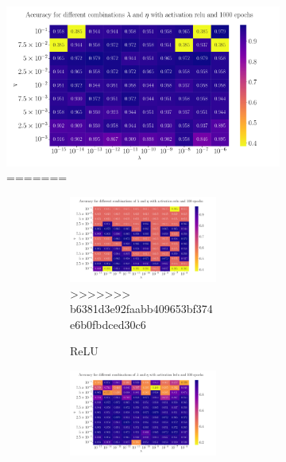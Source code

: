 \documentclass[%
reprint,
amsmath,amssymb,
aps,
]{revtex4-2}
\begin{document}
\begin{figure}
	\begin{subfigure}{0.497\textwidth}
		\includegraphics[width=\textwidth]{Python/Figures/accuracy_heatmap_relu_epochs1000.pdf}
=======
\begin{figure}[ht!]
	\begin{subfigure}{0.4353\textwidth}
		\includegraphics[width=\textwidth]{Python/Figures/Cancer_Accuracy_Heatmap_relu_Epochs100.pdf}
>>>>>>> b6381d3e92faabb409653bf374e6b0fbdced30c6
		\caption{ReLU}
		\label{fig:ReLU_heatmap}
	\end{subfigure}
	\hfill
	\begin{subfigure}{0.4353\textwidth}
		\includegraphics[width=\textwidth]{Python/Figures/Cancer_Accuracy_Heatmap_lrelu_Epochs100.pdf}

\end{subfigure}
\end{figure}
\end{subfigure}
\end{figure}
\end{document}
